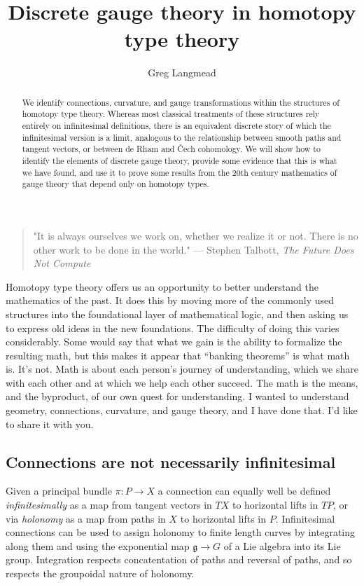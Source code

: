\documentclass[12pt]{article}
\title{Discrete gauge theory in homotopy type theory}
\author{Greg Langmead}
\begin{document}
\begin{abstract}
We identify connections, curvature, and gauge transformations within the structures of homotopy type theory. Whereas most classical treatments of these structures rely entirely on infinitesimal definitions, there is an equivalent discrete story of which the infinitesimal version is a limit, analogous to the relationship between smooth paths and tangent vectors, or between de Rham and Čech cohomology. We will show how to identify the elements of discrete gauge theory, provide some evidence that this is what we have found, and use it to prove some results from the 20th century mathematics of gauge theory that depend only on homotopy types.
\end{abstract}


\begin{quote} 
\centering 
"It is always ourselves we work on, whether we realize it or not. There is no other work to be done in the world." --- Stephen Talbott, \emph{The Future Does Not Compute}\cite{talbott}
\end{quote}

Homotopy type theory offers us an opportunity to better understand the mathematics of the past. It does this by moving more of the commonly used structures into the foundational layer of mathematical logic, and then asking us to express old ideas in the new foundations. The difficulty of doing this varies considerably. Some would say that what we gain is the ability to formalize the resulting math, but this makes it appear that ``banking theorems'' is what math is. It's not. Math is about each person's journey of understanding, which we share with each other and at which we help each other succeed. The math is the means, and the byproduct, of our own quest for understanding. I wanted to understand geometry, connections, curvature, and gauge theory, and I have done that. I'd like to share it with you.

\subsection{Connections are not necessarily infinitesimal}

Given a principal bundle \( \pi:P\to X \) a connection can equally well be defined \emph{infinitesimally} as a map from tangent vectors in \( TX \) to horizontal lifts in \( TP \), or via \emph{holonomy} as a map from paths in \( X \) to horizontal lifts in \( P \). Infinitesimal connections can be used to assign holonomy to finite length curves by integrating along them and using the exponential map \( \mathfrak{g}\to G \) of a Lie algebra into its Lie group. Integration respects concatentation of paths and reversal of paths, and so respects the groupoidal nature of holonomy.
\end{document}
